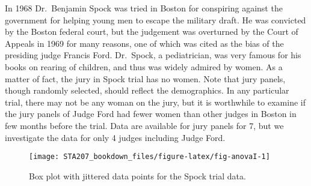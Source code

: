 \documentclass[12pt,]{book}
\newenvironment{Shaded}{\begin{snugshade}}{\end{snugshade}}
\newcommand{\KeywordTok}[1]{\textcolor[rgb]{0.13,0.29,0.53}{\textbf{#1}}}
\newcommand{\DataTypeTok}[1]{\textcolor[rgb]{0.13,0.29,0.53}{#1}}
\newcommand{\DecValTok}[1]{\textcolor[rgb]{0.00,0.00,0.81}{#1}}
\newcommand{\StringTok}[1]{\textcolor[rgb]{0.31,0.60,0.02}{#1}}
\newcommand{\CommentTok}[1]{\textcolor[rgb]{0.56,0.35,0.01}{\textit{#1}}}
\newcommand{\OtherTok}[1]{\textcolor[rgb]{0.56,0.35,0.01}{#1}}
\newcommand{\OperatorTok}[1]{\textcolor[rgb]{0.81,0.36,0.00}{\textbf{#1}}}
\newcommand{\NormalTok}[1]{#1}
\begin{document}
In 1968 Dr.~Benjamin Spock was tried in Boston for conspiring against
the government for helping young men to escape the military draft. He
was convicted by the Boston federal court, but the judgement was
overturned by the Court of Appeals in 1969 for many reasons, one of
which was cited as the bias of the presiding judge Francis Ford.
Dr.~Spock, a pediatrician, was very famous for his books on rearing of
children, and thus was widely admired by women. As a matter of fact, the
jury in Spock trial has no women. Note that jury panels, though randomly
selected, should reflect the demographics. In any particular trial,
there may not be any woman on the jury, but it is worthwhile to examine
if the jury panels of Judge Ford had fewer women than other judges in
Boston in few months before the trial. Data are available for jury
panels for 7, but we investigate the data for only 4 judges including
Judge Ford.

\begin{Shaded}
\end{Shaded}

\begin{figure}

{\centering \texttt{[image: STA207\_bookdown\_files/figure-latex/fig-anovaI-1]} 

}

\caption{Box plot with jittered data points for the Spock trial data.}\label{fig:fig-anovaI}
\end{figure}
\end{document}

